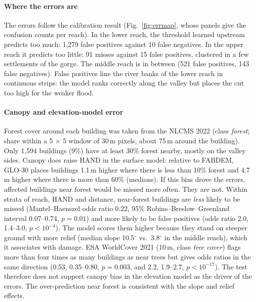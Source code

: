 \documentclass[journal,a4paper]{IEEEtran}
\begin{document}
\paragraph{Where the errors are} The errors follow the calibration result (Fig.~\ref{fig:errmap}, whose panels give the confusion counts per reach). In the lower reach, the threshold learned upstream predicts too much: 1,279 false positives against 10 false negatives. In the upper reach it predicts too little: 91 misses against 15 false positives, clustered in a few settlements of the gorge. The middle reach is in between (521 false positives, 143 false negatives). False positives line the river banks of the lower reach in continuous strips: the model ranks correctly along the valley but places the cut too high for the weaker flood.

\paragraph{Canopy and elevation-model error} Forest cover around each building was taken from the NLCMS 2022 \citep{nlcms} (class \emph{forest}; share within a 5 $\times$ 5 window of 30\,m pixels, about 75\,m around the building). Only 1,594 buildings (9\%) have at least 30\% forest nearby, mostly on the valley sides. Canopy does raise HAND in the surface model: relative to FABDEM, GLO-30 places buildings 1.1\,m higher where there is less than 10\% forest and 4.7\,m higher where there is more than 60\% (medians). If this bias drove the errors, affected buildings near forest would be missed more often. They are not. Within strata of reach, HAND and distance, near-forest buildings are \emph{less} likely to be missed (Mantel--Haenszel odds ratio 0.22, 95\% Robins--Breslow--Greenland interval 0.07--0.74, $p = 0.01$) and more likely to be false positives (odds ratio 2.0, 1.4--3.0, $p < 10^{-4}$). The model scores them higher because they stand on steeper ground with more relief (median slope 10.5$^\circ$ vs.\ 3.8$^\circ$ in the middle reach), which it associates with damage. ESA WorldCover 2021 \citep{zanaga2022} (10\,m, class \emph{tree cover}) flags more than four times as many buildings as near trees but gives odds ratios in the same direction (0.53, 0.35--0.80, $p = 0.003$, and 2.2, 1.9--2.7, $p < 10^{-17}$). The test therefore does not support canopy bias in the elevation model as the driver of the errors. The over-prediction near forest is consistent with the slope and relief effects.



\end{document}

